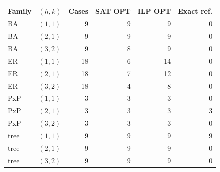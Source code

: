 \begin{tabular}{llrrrr}
\toprule
Family & $(h,k)$ & Cases & SAT OPT & ILP OPT & Exact ref.\\
\midrule
BA & $(1,1)$ & 9 & 9 & 9 & 0\\
BA & $(2,1)$ & 9 & 9 & 9 & 0\\
BA & $(3,2)$ & 9 & 8 & 9 & 0\\
ER & $(1,1)$ & 18 & 6 & 14 & 0\\
ER & $(2,1)$ & 18 & 7 & 12 & 0\\
ER & $(3,2)$ & 18 & 4 & 8 & 0\\
PxP & $(1,1)$ & 3 & 3 & 3 & 0\\
PxP & $(2,1)$ & 3 & 3 & 3 & 3\\
PxP & $(3,2)$ & 3 & 3 & 3 & 0\\
tree & $(1,1)$ & 9 & 9 & 9 & 9\\
tree & $(2,1)$ & 9 & 9 & 9 & 0\\
tree & $(3,2)$ & 9 & 9 & 9 & 0\\
\bottomrule
\end{tabular}

